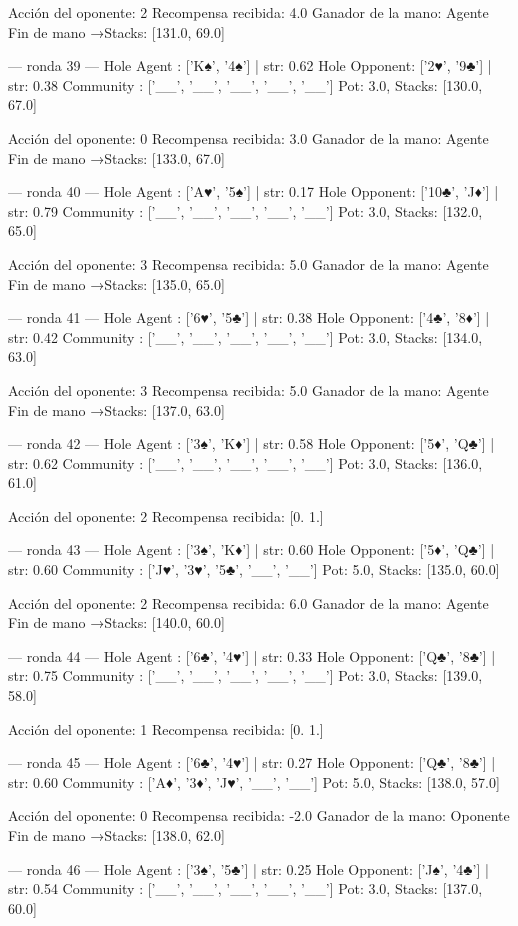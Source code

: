 Acción del oponente: 2
Recompensa recibida: 4.0
Ganador de la mano: Agente
Fin de mano →Stacks: [131.0, 69.0]


--- ronda 39 ---
Hole Agent : ['K♠', '4♠'] | str: 0.62
Hole Opponent: ['2♥', '9♣'] | str: 0.38
Community  : ['__', '__', '__', '__', '__']
Pot: 3.0, Stacks: [130.0, 67.0]

Acción del oponente: 0
Recompensa recibida: 3.0
Ganador de la mano: Agente
Fin de mano →Stacks: [133.0, 67.0]


--- ronda 40 ---
Hole Agent : ['A♥', '5♠'] | str: 0.17
Hole Opponent: ['10♣', 'J♦'] | str: 0.79
Community  : ['__', '__', '__', '__', '__']
Pot: 3.0, Stacks: [132.0, 65.0]

Acción del oponente: 3
Recompensa recibida: 5.0
Ganador de la mano: Agente
Fin de mano →Stacks: [135.0, 65.0]


--- ronda 41 ---
Hole Agent : ['6♥', '5♣'] | str: 0.38
Hole Opponent: ['4♣', '8♦'] | str: 0.42
Community  : ['__', '__', '__', '__', '__']
Pot: 3.0, Stacks: [134.0, 63.0]

Acción del oponente: 3
Recompensa recibida: 5.0
Ganador de la mano: Agente
Fin de mano →Stacks: [137.0, 63.0]


--- ronda 42 ---
Hole Agent : ['3♠', 'K♦'] | str: 0.58
Hole Opponent: ['5♦', 'Q♣'] | str: 0.62
Community  : ['__', '__', '__', '__', '__']
Pot: 3.0, Stacks: [136.0, 61.0]

Acción del oponente: 2
Recompensa recibida: [0. 1.]

--- ronda 43 ---
Hole Agent : ['3♠', 'K♦'] | str: 0.60
Hole Opponent: ['5♦', 'Q♣'] | str: 0.60
Community  : ['J♥', '3♥', '5♣', '__', '__']
Pot: 5.0, Stacks: [135.0, 60.0]

Acción del oponente: 2
Recompensa recibida: 6.0
Ganador de la mano: Agente
Fin de mano →Stacks: [140.0, 60.0]


--- ronda 44 ---
Hole Agent : ['6♣', '4♥'] | str: 0.33
Hole Opponent: ['Q♣', '8♣'] | str: 0.75
Community  : ['__', '__', '__', '__', '__']
Pot: 3.0, Stacks: [139.0, 58.0]

Acción del oponente: 1
Recompensa recibida: [0. 1.]

--- ronda 45 ---
Hole Agent : ['6♣', '4♥'] | str: 0.27
Hole Opponent: ['Q♣', '8♣'] | str: 0.60
Community  : ['A♦', '3♦', 'J♥', '__', '__']
Pot: 5.0, Stacks: [138.0, 57.0]

Acción del oponente: 0
Recompensa recibida: -2.0
Ganador de la mano: Oponente
Fin de mano →Stacks: [138.0, 62.0]


--- ronda 46 ---
Hole Agent : ['3♠', '5♣'] | str: 0.25
Hole Opponent: ['J♠', '4♣'] | str: 0.54
Community  : ['__', '__', '__', '__', '__']
Pot: 3.0, Stacks: [137.0, 60.0]

